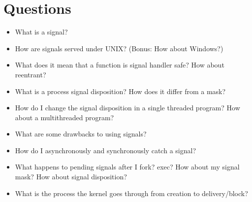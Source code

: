 \section{Questions}

\begin{itemize}
\tightlist
\item
  What is a signal?
\item
  How are signals served under UNIX? (Bonus: How about Windows?)
\item
  What does it mean that a function is signal handler safe? How about reentrant?
\item
  What is a process signal disposition? How does it differ from a mask?
\item
  How do I change the signal disposition in a single threaded program?
  How about a multithreaded program?
\item
  What are some drawbacks to using signals?
\item
  How do I asynchronously and synchronously catch a signal?
\item
  What happens to pending signals after I fork? exec? How about my signal mask? How about signal disposition?
\item
  What is the process the kernel goes through from creation to delivery/block?
\end{itemize}



